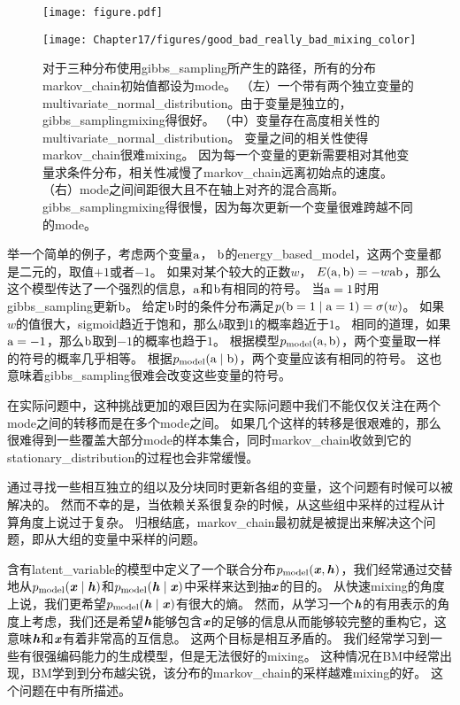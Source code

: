 \begin{figure}[!htb]
\ifOpenSource
\centerline{\texttt{[image: figure.pdf]}}
\else
	\centerline{\texttt{[image: Chapter17/figures/good\_bad\_really\_bad\_mixing\_color]}}
\fi
	\caption{对于三种分布使用\gls{gibbs_sampling}所产生的路径，所有的分布\gls{markov_chain}初始值都设为\gls{mode}。
	（左）一个带有两个独立变量的\gls{multivariate_normal_distribution}。由于变量是独立的，\gls{gibbs_sampling}\gls{mixing}得很好。
	（中）变量存在高度相关性的\gls{multivariate_normal_distribution}。
	变量之间的相关性使得\gls{markov_chain}很难\gls{mixing}。
	因为每一个变量的更新需要相对其他变量求条件分布，相关性减慢了\gls{markov_chain}远离初始点的速度。
	（右）\gls{mode}之间间距很大且不在轴上对齐的混合高斯。
	\gls{gibbs_sampling}\gls{mixing}得很慢，因为每次更新一个变量很难跨越不同的\gls{mode}。}
	\label{fig:chap17_good_bad_really_bad_mixing_color}
\end{figure}


举一个简单的例子，考虑两个变量$\mathrm{a}$， $\mathrm{b}$的\gls{energy_based_model}，这两个变量都是二元的，取值$+1$或者$-1$。
如果对某个较大的正数$w$， $E(\mathrm{a},\mathrm{b}) = - w \mathrm{a} \mathrm{b}$，那么这个模型传达了一个强烈的信息，$\mathrm{a}$和$\mathrm{b}$有相同的符号。
当$\mathrm{a}=1$时用\gls{gibbs_sampling}更新$\mathrm{b}$。
给定$\mathrm{b}$时的条件分布满足$p(\mathrm{b}=1\mid \mathrm{a}=1) = \sigma(w)$。
如果$w$的值很大，\gls{sigmoid}趋近于饱和，那么$b$取到$1$的概率趋近于$1$。
相同的道理，如果$\mathrm{a}=-1$，那么$\mathrm{b}$取到$-1$的概率也趋于$1$。
根据模型$p_{\text{model}}(\mathrm{a},\mathrm{b})$，两个变量取一样的符号的概率几乎相等。
根据$p_{\text{model}}(\mathrm{a}\mid \mathrm{b})$，两个变量应该有相同的符号。
这也意味着\gls{gibbs_sampling}很难会改变这些变量的符号。

在实际问题中，这种挑战更加的艰巨因为在实际问题中我们不能仅仅关注在两个\gls{mode}之间的转移而是在多个\gls{mode}之间。
如果几个这样的转移是很艰难的，那么很难得到一些覆盖大部分\gls{mode}的样本集合，同时\gls{markov_chain}收敛到它的\gls{stationary_distribution}的过程也会非常缓慢。

通过寻找一些相互独立的组以及分块同时更新各组的变量，这个问题有时候可以被解决的。
然而不幸的是，当依赖关系很复杂的时候，从这些组中采样的过程从计算角度上说过于复杂。
归根结底，\gls{markov_chain}最初就是被提出来解决这个问题，即从大组的变量中采样的问题。

含有\gls{latent_variable}的模型中定义了一个联合分布$p_{\text{model}}(\boldsymbol{\mathit{x}},\boldsymbol{\mathit{h}})$，我们经常通过交替地从$p_{\text{model}}(\boldsymbol{\mathit{x}}\mid \boldsymbol{\mathit{h}})$和$p_{\text{model}}(\boldsymbol{\mathit{h}}\mid \boldsymbol{\mathit{x}})$中采样来达到抽$\boldsymbol{\mathit{x}}$的目的。
从快速\gls{mixing}的角度上说，我们更希望$p_{\text{model}}(\boldsymbol{\mathit{h}}\mid \boldsymbol{\mathit{x}})$有很大的熵。
然而，从学习一个$\boldsymbol{\mathit{h}}$的有用表示的角度上考虑，我们还是希望$\boldsymbol{\mathit{h}}$能够包含$\boldsymbol{\mathit{x}}$的足够的信息从而能够较完整的重构它，这意味$\boldsymbol{\mathit{h}}$和$\boldsymbol{\mathit{x}}$有着非常高的互信息。
这两个目标是相互矛盾的。
我们经常学习到一些有很强编码能力的生成模型，但是无法很好的\gls{mixing}。
这种情况在\gls{BM}中经常出现，\gls{BM}学到到分布越尖锐，该分布的\gls{markov_chain}的采样越难\gls{mixing}的好。
这个问题在中有所描述。

